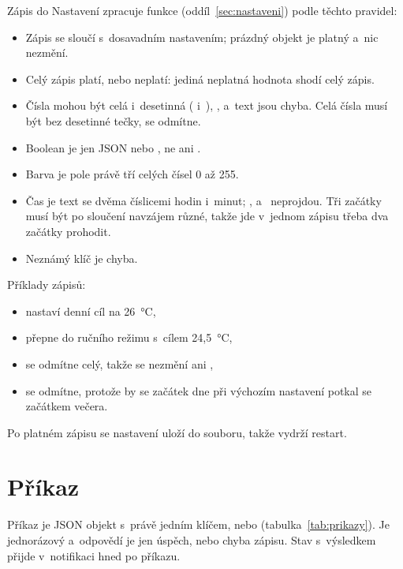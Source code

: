 Zápis do Nastavení zpracuje funkce  (oddíl~\ref{sec:nastaveni}) podle těchto
pravidel:
\begin{itemize}
  \item Zápis se sloučí s~dosavadním nastavením; prázdný objekt \kod{{}} je platný a~nic
        nezmění.
  \item Celý zápis platí, nebo neplatí: jediná neplatná hodnota shodí celý zápis.
  \item Čísla mohou být celá i~desetinná ( i~), , 
        a~text jsou chyba. Celá čísla musí být bez desetinné tečky,  se odmítne.
  \item Boolean je jen JSON  nebo , ne  ani .
  \item Barva je pole právě tří celých čísel 0 až 255.
  \item Čas je text  se dvěma číslicemi hodin i~minut; , 
        a~ neprojdou. Tři začátky musí být po sloučení navzájem různé, takže jde
        v~jednom zápisu třeba dva začátky prohodit.
  \item Neznámý klíč je chyba.
\end{itemize}
Příklady zápisů:
\begin{itemize}
  \item {} nastaví denní cíl na 26~°C,
  \item {} přepne do ručního režimu s~cílem
        24,5~°C,
  \item {} se odmítne celý, takže se nezmění ani ,
  \item {} se odmítne, protože by se začátek dne při výchozím
        nastavení potkal se začátkem večera.
\end{itemize}
Po platném zápisu se nastavení uloží do souboru, takže vydrží restart.

\section{Příkaz}
\label{sec:rozhrani-prikaz}

Příkaz je JSON objekt s~právě jedním klíčem,  nebo 
(tabulka~\ref{tab:prikazy}). Je jednorázový a~odpovědí je jen úspěch, nebo chyba zápisu. Stav
s~výsledkem přijde v~notifikaci hned po příkazu.

